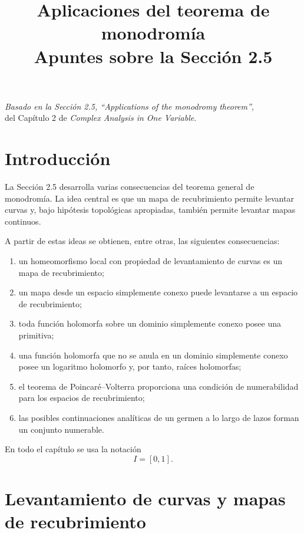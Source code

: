 \documentclass[11pt,a4paper]{article}
\title{\textbf{Aplicaciones del teorema de monodromía}\\
\large Apuntes sobre la Sección 2.5}
\author{}
\date{}
\theoremstyle{definition}
\theoremstyle{plain}
\theoremstyle{remark}
\begin{document}
\maketitle

\begin{center}
\emph{Basado en la Sección 2.5, ``Applications of the monodromy theorem'',}\\
del Capítulo 2 de \emph{Complex Analysis in One Variable}.
\end{center}

\tableofcontents
\newpage

\section{Introducción}

La Sección 2.5 desarrolla varias consecuencias del teorema general de
monodromía. La idea central es que un mapa de recubrimiento permite
levantar curvas y, bajo hipótesis topológicas apropiadas, también permite
levantar mapas continuos.

A partir de estas ideas se obtienen, entre otras, las siguientes
consecuencias:

\begin{enumerate}[label=\arabic*.]
    \item un homeomorfismo local con propiedad de levantamiento de curvas
    es un mapa de recubrimiento;
    \item un mapa desde un espacio simplemente conexo puede levantarse
    a un espacio de recubrimiento;
    \item toda función holomorfa sobre un dominio simplemente conexo
    posee una primitiva;
    \item una función holomorfa que no se anula en un dominio simplemente
    conexo posee un logaritmo holomorfo y, por tanto, raíces holomorfas;
    \item el teorema de Poincaré--Volterra proporciona una condición de
    numerabilidad para los espacios de recubrimiento;
    \item las posibles continuaciones analíticas de un germen a lo largo
    de lazos forman un conjunto numerable.
\end{enumerate}

En todo el capítulo se usa la notación
\[
I=[0,1].
\]

\section{Levantamiento de curvas y mapas de recubrimiento}
\end{document}
